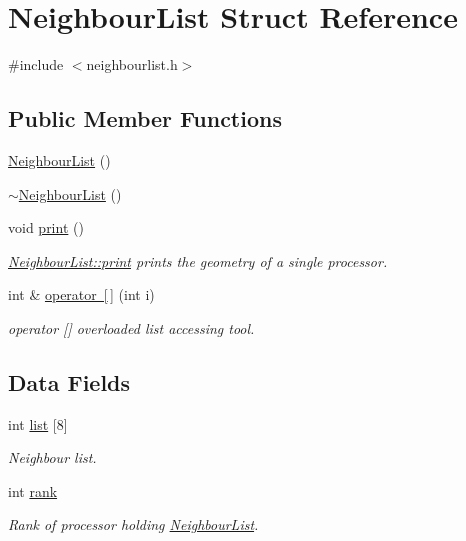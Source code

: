 \hypertarget{struct_neighbour_list}{}\section{Neighbour\+List Struct Reference}
\label{struct_neighbour_list}


{\ttfamily \#include $<$neighbourlist.\+h$>$}

\subsection*{Public Member Functions}
\begin{DoxyCompactItemize}
\item 
\mbox{\hyperlink{struct_neighbour_list_ab376c095d360ea03b0e499a8820bd0e7}{Neighbour\+List}} ()
\item 
\mbox{\hyperlink{struct_neighbour_list_afcdbcc7fde83d4ce3a4fecc8d4105cd8}{$\sim$\+Neighbour\+List}} ()
\item 
void \mbox{\hyperlink{struct_neighbour_list_a9e8123deded59c4c702429fda52af140}{print}} ()
\begin{DoxyCompactList}\small\item\em \mbox{\hyperlink{struct_neighbour_list_a9e8123deded59c4c702429fda52af140}{Neighbour\+List\+::print}} prints the geometry of a single processor. \end{DoxyCompactList}\item 
int \& \mbox{\hyperlink{struct_neighbour_list_a9bd6ad04ef1eb6ad9737ac493b6864d1}{operator \mbox{[}$\,$\mbox{]}}} (int i)
\begin{DoxyCompactList}\small\item\em operator \mbox{[}\mbox{]} overloaded list accessing tool. \end{DoxyCompactList}\end{DoxyCompactItemize}
\subsection*{Data Fields}
\begin{DoxyCompactItemize}
\item 
int \mbox{\hyperlink{struct_neighbour_list_ad55e922aabd4ef75711d22c5e5634165}{list}} \mbox{[}8\mbox{]}
\begin{DoxyCompactList}\small\item\em Neighbour list. \end{DoxyCompactList}\item 
int \mbox{\hyperlink{struct_neighbour_list_abe10231f4cd3e607e19cea0b0d7aab03}{rank}}
\begin{DoxyCompactList}\small\item\em Rank of processor holding \mbox{\hyperlink{struct_neighbour_list}{Neighbour\+List}}. \end{DoxyCompactList}\end{DoxyCompactItemize}


